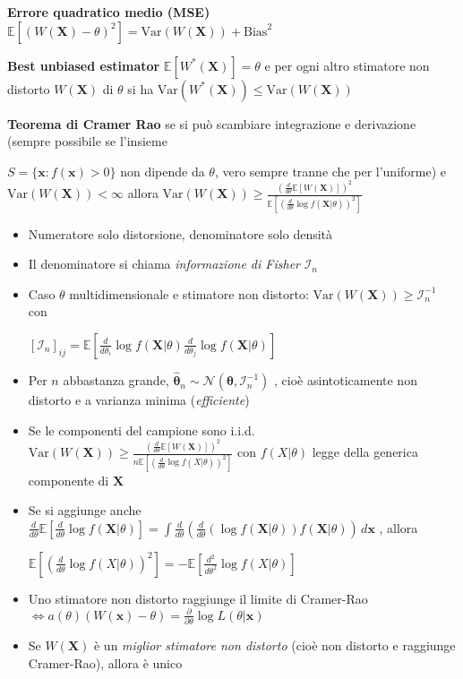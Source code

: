 \documentclass[openany]{book} %
\begin{document}
\textbf{Errore quadratico medio (MSE)} $\mathbb{E}[(W(\boldsymbol{X})-\theta)^2]=\text{Var}(W(\boldsymbol{X}))+\text{Bias}^2$

\textbf{Best unbiased estimator} $\mathbb{E}[W^*(\boldsymbol{X})]=\theta$ e per ogni altro stimatore non distorto $W(\boldsymbol{X})$ di $\theta$ si ha $\text{Var}(W^*(\boldsymbol{X}))\leq \text{Var}(W(\boldsymbol{X}))$

\textbf{Teorema di Cramer Rao} se si può scambiare integrazione e derivazione (sempre possibile se l'insieme

$S=\{\boldsymbol{x}:f(\boldsymbol{x})>0\}$ non dipende da $\theta$, vero sempre tranne che per l'uniforme) e $\text{Var}(W(\boldsymbol{X}))<\infty$ allora $\text{Var}(W(\boldsymbol{X}))\geq \frac{(\frac{d}{d\theta}\mathbb{E}[W(\boldsymbol{X})])^2}{\mathbb{E}[(\frac{d}{d\theta}\log f(\boldsymbol{X}|\theta))^2]}$

\begin{itemize}

	\item Numeratore solo distorsione, denominatore solo densità

	\item Il denominatore si chiama \textit{informazione di Fisher} $\mathcal{I}_n$

	\item Caso $\theta$ multidimensionale e stimatore non distorto: $\text{Var}(W(\boldsymbol{X}))\geq \mathcal{I}_n^{-1}$ con

	      $[\mathcal{I}_n]_{ij}=\mathbb{E}[\frac{d}{d\theta_i}\log f(\boldsymbol{X}|\theta)\frac{d}{d\theta_j}\log f(\boldsymbol{X}|\theta)]$

	\item Per $n$ abbastanza grande, $\hat {\boldsymbol{\theta}}_n\sim \mathcal{N}(\boldsymbol{\theta},\mathcal{I}_n^{-1})$ , cioè asintoticamente non distorto e a varianza minima (\textit{efficiente})

	\item Se le componenti del campione sono i.i.d. $\text{Var}(W(\boldsymbol{X}))\geq \frac{(\frac{d}{d\theta}\mathbb{E}[W(\boldsymbol{X})])^2}{n\mathbb{E}[(\frac{d}{d\theta}\log f(X|\theta))^2]}$ con $f(X|\theta)$  legge della generica componente di $\boldsymbol{X}$

	\item Se si aggiunge anche $\frac{d}{d\theta}\mathbb{E}[\frac{d}{d\theta}\log f(\boldsymbol{X}|\theta)]=\int\frac{d}{d\theta}(\frac{d}{d\theta}(\log f(\boldsymbol{X}|\theta))f(\boldsymbol{X}|\theta))\,d \boldsymbol{x}$ , allora

	      $\mathbb{E}[(\frac{d}{d\theta}\log f(X|\theta))^2]=-\mathbb{E}[\frac{d^2}{d\theta^2}\log f(X|\theta)]$

	\item Uno stimatore non distorto raggiunge il limite di Cramer-Rao $\Leftrightarrow a(\theta)(W(\boldsymbol{x})-\theta)=\frac{\partial}{\partial\theta}\log L(\theta|\boldsymbol{x})$

	\item Se $W(\boldsymbol{X})$ è un \textit{miglior stimatore non distorto} (cioè non distorto e raggiunge Cramer-Rao), allora è unico

\end{itemize}
\end{document}
